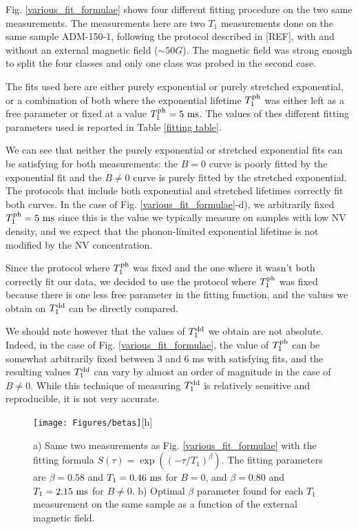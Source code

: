 \documentclass[a4paper,11pt]{report}
\begin{document}
Fig. \ref{various_fit_formulae} shows four different fitting procedure on the two same measurements. The measurements here are two $T_1$ measurements done on the same sample ADM-150-1, following the protocol described in [REF], with and without an external magnetic field ($\sim 50 G$). The magnetic field was strong enough to split the four classes and only one class was probed in the second case.

The fits used here are either purely exponential or purely stretched exponential, or a combination of both where the exponential lifetime $T_1^{\rm ph}$ was either left as a free parameter or fixed at a value $T_1^{\rm ph}=5\ \rm ms$. The values of thes different fitting parameters used is reported in Table \ref{fitting table}.

We can see that neither the purely exponential or stretched exponential fits can be satisfying for both measurements: the $B=0$ curve is poorly fitted by the exponential fit and the $B \neq 0$ curve is purely fitted by the stretched exponential. The protocols that include both exponential and stretched lifetimes correctly fit both curves. In the case of Fig. \ref{various_fit_formulae}-d), we arbitrarily fixed $T_1^{\rm ph}=5\ \rm ms$ since this is the value we typically measure on samples with low NV density, and we expect that the phonon-limited exponential lifetime is not modified by the NV concentration.

Since the protocol where $T_1^{\rm ph}$ was fixed and the one where it wasn't both correctly fit our data, we decided to use the protocol where $T_1^{\rm ph}$ was fixed because there is one less free parameter in the fitting function, and the values we obtain on $T_1^{\rm dd}$ can be directly compared. 

We should note however that the values of $T_1^{\rm dd}$ we obtain are not absolute. Indeed, in the case of Fig. \ref{various_fit_formulae}, the value of $T_1^{\rm ph}$ can be somewhat arbitrarily fixed between 3 and 6 ms with satisfying fits, and the resulting values $T_1^{\rm dd}$ can vary by almost an order of magnitude in the case of $B\neq0$. While this technique of measuring $T_1^{\rm dd}$ is relatively sensitive and reproducible, it is not very accurate.

\begin{figure}[h]
\centering
\texttt{[image: Figures/betas]}[h]
\label{betas}
\caption{a) Same two measurements as Fig. \ref{various_fit_formulae} with the fitting formula $S(\tau)=\exp ((-\tau/T_1)^{\beta})$. The fitting parameters are $\beta=0.58$ and $T_1=0.46\ \rm ms$ for $B=0$, and $\beta=0.80$ and $T_1=2.15\ \rm ms$ for $B\neq0$. b) Optimal $\beta$ parameter found for each $T_1$ measurement on the same sample as a function of the external magnetic field.}
\end{figure}
\end{document}
